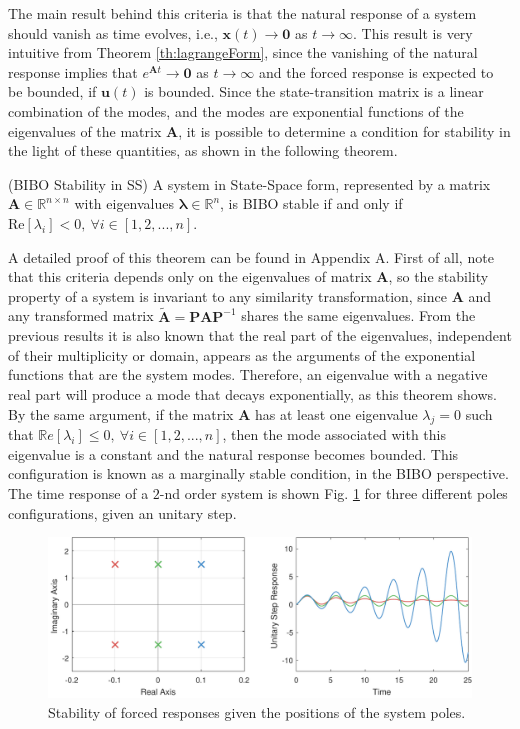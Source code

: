 \documentclass[a4paper,11pt]{book}
\numberwithin{figure}{chapter}
\numberwithin{equation}{chapter}
\numberwithin{table}{chapter}
\newtheorem{theorem}{Theorem}[chapter]
\theoremstyle{definition}
\newcounter{boxed-theorem}
\newenvironment{boxed-theorem}[1]
{\colorlet{shadecolor}{pastelBlue2!10} \begin{shaded} \begin{theorem}{#1}}
{\end{theorem} \end{shaded}}
\newcounter{boxed-definition}
\newcounter{boxed-example}
\begin{document}
The main result behind this criteria is that the natural response of a system should vanish as time evolves, i.e., $\bm{x}(t) \to \bm{0}$ as $t \to \infty$. This result is very intuitive from Theorem \ref{th:lagrangeForm}, since the vanishing of the natural response implies that $e^{\bm{A} t} \to \bm{0}$ as $t \to \infty$ and the forced response is expected to be bounded, if $\bm{u}(t)$ is bounded. Since the state-transition matrix is a linear combination of the modes, and the modes are exponential functions of the eigenvalues of the matrix $\bm{A}$, it is possible to determine a condition for stability in the light of these quantities, as shown in the following theorem.

\begin{boxed-theorem}{(BIBO Stability in SS)} \label{th:BIBOStab}
    A system in State-Space form, represented by a matrix $\bm{A} \in \mathbb{R}^{n \times n}$ with eigenvalues $\bm{\lambda} \in \mathbb{R}^n$, is BIBO stable if and only if $\text{Re}[\lambda_i] < 0,\ \forall i \in [1,2,...,n]$.
\end{boxed-theorem}

A detailed proof of this theorem can be found in Appendix A. First of all, note that this criteria depends only on the eigenvalues of matrix $\bm{A}$, so the stability property of a system is invariant to any similarity transformation, since $\bm{A}$ and any transformed matrix $\tilde{\bm{A}} = \bm{P} \bm{A} \bm{P}^{-1}$ shares the same eigenvalues. From the previous results it is also known that the real part of the eigenvalues, independent of their multiplicity or domain, appears as the arguments of the exponential functions that are the system modes. Therefore, an eigenvalue with a negative real part will produce a mode that decays exponentially, as this theorem shows. By the same argument, if the matrix $\bm{A}$ has at least one eigenvalue $\lambda_j = 0$ such that $\mathbb{R}e[\lambda_i] \leq 0,\ \forall i \in [1,2,...,n]$, then the mode associated with this eigenvalue is a constant and the natural response becomes bounded. This configuration is known as a marginally stable condition, in the BIBO perspective. The time response of a $2$-nd order system is shown Fig. \ref{fig:stability01} for three different poles configurations, given an unitary step.

\begin{figure}[ht] \centering
    \includegraphics[width=\textwidth]{chapter2/stability01}
    
    \caption{Stability of forced responses given the positions of the system poles.}
    \label{fig:stability01}
\end{figure} 
\end{document}
